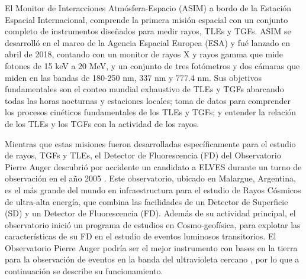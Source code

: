 \documentclass[12pt,oneside,openany,letter]{book}
\begin{document}
El Monitor de Interacciones Atmósfera-Espacio (ASIM) \cite{neubertEtal2019} a bordo de la Estaci\'on Espacial Internacional, comprende la primera misión espacial con un conjunto completo de instrumentos diseñados para medir rayos, TLEs y TGFs. ASIM se desarroll\'o en el marco de la Agencia Espacial Europea (ESA) y fu\'e lanzado en abril de 2018, contando con un monitor de rayos X y rayos gamma que mide fotones de 15 keV a 20 MeV, y un conjunto de tres fotómetros y dos cámaras que miden en las bandas de 180-250 nm, 337 nm y 777.4 nm. Sus objetivos fundamentales son el conteo mundial exhaustivo de TLEs y TGFs abarcando todas las horas nocturnas y estaciones locales; toma de datos para comprender los procesos cinéticos fundamentales de los TLEs y TGFs; y entender la relación de los TLEs y los TGFs con la actividad de los rayos.


Mientras que estas misiones fueron desarrolladas específicamente para el estudio de rayos, TGFs y TLEs, el Detector de Fluorescencia (FD) del Observatorio Pierre Auger descubrió por accidente un candidato a ELVES durante un turno de observación en el año 2005 \cite{Mussa2019}. Este observatorio, ubicado en Malargue, Argentina, es el más grande del mundo en infraestructura para el estudio de Rayos Cósmicos de ultra-alta energía, que combina las facilidades de un Detector de Superficie (SD) y un Detector de Fluorescencia (FD). Además de su actividad principal, el observatorio inició un programa de estudios en Cosmo-geofísica, para explotar las características de su FD en el estudio de eventos luminosos transitorios. El Observatorio Pierre Auger podría ser el mejor instrumento con bases en la tierra para la observación de eventos en la banda del ultravioleta cercano \cite{MussaCiaccio2012}, por lo que a continuación se describe su funcionamiento.  

\end{document}
